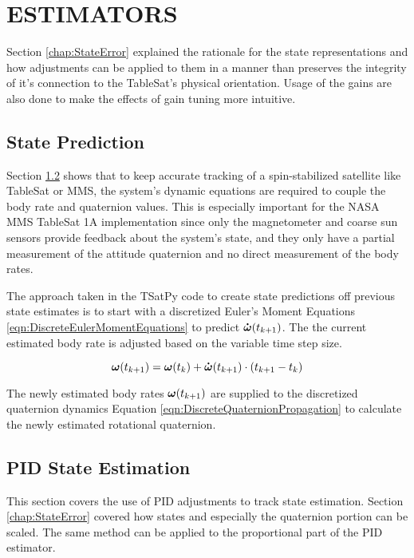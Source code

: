
\chapter{ESTIMATORS}
\label{chap:Estimators}

Section \ref{chap:StateError} explained the rationale for the state representations and how adjustments can be applied to them in a manner than preserves the integrity of it's connection to the TableSat's physical orientation.  Usage of the gains are also done to make the effects of gain tuning more intuitive.

\section{State Prediction}
\label{sec:StatePrediction}

Section \ref{sec:BodyRatePIDEstimation} shows that to keep accurate tracking of a spin-stabilized satellite like TableSat or MMS, the system's dynamic equations are required to couple the body rate and quaternion values.  This is especially important for the NASA MMS TableSat 1A implementation since only the magnetometer and coarse sun sensors provide feedback about the system's state, and they only have a partial measurement of the attitude quaternion and no direct measurement of the body rates.

The approach taken in the TSatPy code to create state predictions off previous state estimates is to start with a discretized Euler's Moment Equations \ref{eqn:DiscreteEulerMomentEquations} to predict $\boldsymbol{\dot{\omega}}(t_{k+1})$.  The the current estimated body rate is adjusted based on the variable time step size.

\begin{equation}
  \boldsymbol{\omega}(t_{k+1}) = \boldsymbol{\omega}(t_{k}) + \boldsymbol{\dot{\omega}}(t_{k+1})\cdot (t_{k+1} - t_k)
\end{equation}

The newly estimated body rates $\boldsymbol{\omega}(t_{k+1})$ are supplied to the discretized quaternion dynamics Equation \ref{eqn:DiscreteQuaternionPropagation} to calculate the newly estimated rotational quaternion.

\section{PID State Estimation}
\label{sec:BodyRatePIDEstimation}

This section covers the use of PID adjustments to track state estimation.  Section \ref{chap:StateError} covered how states and especially the quaternion portion can be scaled.  The same method can be applied to the proportional part of the PID estimator.

